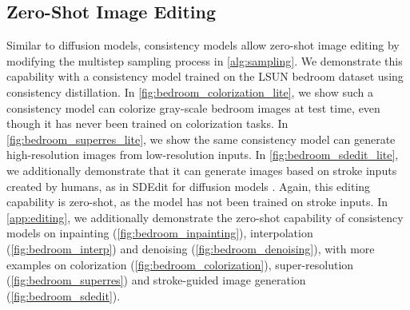 \subsection{Zero-Shot Image Editing}\label{sec:zeroshot}
Similar to diffusion models, consistency models allow zero-shot image editing by modifying the multistep sampling process in \cref{alg:sampling}. We demonstrate this capability with a consistency model trained on the LSUN bedroom dataset using consistency distillation. In \cref{fig:bedroom_colorization_lite}, we show such a consistency model can colorize gray-scale bedroom images at test time, even though it has never been trained on colorization tasks. In \cref{fig:bedroom_superres_lite}, we show the same consistency model can generate high-resolution images from low-resolution inputs. In \cref{fig:bedroom_sdedit_lite}, we additionally demonstrate that it can generate images based on stroke inputs created by humans, as in SDEdit for diffusion models \cite{meng2021sdedit}. Again, this editing capability is zero-shot, as the model has not been trained on stroke inputs. In \cref{app:editing}, we additionally demonstrate the zero-shot capability of consistency models on inpainting (\cref{fig:bedroom_inpainting}), interpolation (\cref{fig:bedroom_interp}) and denoising (\cref{fig:bedroom_denoising}), with more examples on colorization (\cref{fig:bedroom_colorization}), super-resolution (\cref{fig:bedroom_superres}) and stroke-guided image generation (\cref{fig:bedroom_sdedit}).
